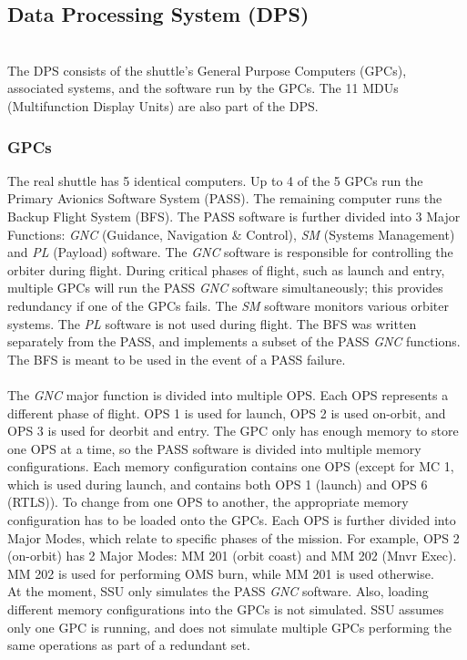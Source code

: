 \documentclass[Space_Shuttle_Ultra_Manual.tex]{subfiles}
\begin{document}
\subsection{Data Processing System (DPS)}
\begin{multicols*}{2}
\renewcommand{\cfttoctitlefont}{\bf}
\localtableofcontents
\noindent
\\
The DPS consists of the shuttle's General Purpose Computers (GPCs), associated systems, and the software run by the GPCs. The 11 MDUs (Multifunction Display Units) are also part of the DPS.
\subsubsection{GPCs}
The real shuttle has 5 identical computers. Up to 4 of the 5 GPCs run the Primary Avionics Software System (PASS). The remaining computer runs the Backup Flight System (BFS). The PASS software is further divided into 3 Major Functions: \textit{GNC} (Guidance, Navigation \& Control), \textit{SM} (Systems Management) and \textit{PL} (Payload) software. The \textit{GNC} software is responsible for controlling the orbiter during flight. During critical phases of flight, such as launch and entry, multiple GPCs will run the PASS \textit{GNC} software simultaneously; this provides redundancy if one of the GPCs fails. The \textit{SM} software monitors various orbiter systems. The \textit{PL} software is not used during flight. The BFS was written separately from the PASS, and implements a subset of the PASS \textit{GNC} functions. The BFS is meant to be used in the event of a PASS failure. \\
\\
The \textit{GNC} major function is divided into multiple OPS. Each OPS represents a different phase of flight. OPS 1 is used for launch, OPS 2 is used on-orbit, and OPS 3 is used for deorbit and entry. The GPC only has enough memory to store one OPS at a time, so the PASS software is divided into multiple memory configurations. Each memory configuration contains one OPS (except for MC 1, which is used during launch, and contains both OPS 1 (launch) and OPS 6 (RTLS)). To change from one OPS to another, the appropriate memory configuration has to be loaded onto the GPCs.
Each OPS is further divided into Major Modes, which relate to specific phases of the mission. For example, OPS 2 (on-orbit) has 2 Major Modes: MM 201 (orbit coast) and MM 202 (Mnvr Exec). MM 202 is used for performing OMS burn, while MM 201 is used otherwise.
\\
At the moment, SSU only simulates the PASS \textit{GNC} software. Also, loading different memory configurations into the GPCs is not simulated. SSU assumes only one GPC is running, and does not simulate multiple GPCs performing the same operations as part of a redundant set.

\end{multicols*}
\end{document}
